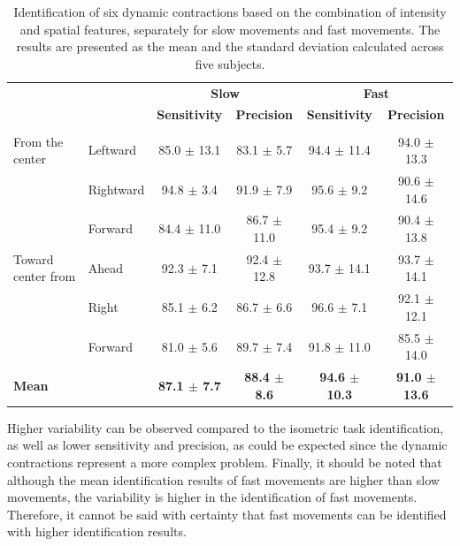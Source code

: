 \begin{table}[h!]
\centering
\caption{Identification of six dynamic contractions based on the combination of intensity and spatial features, separately for slow movements and fast movements. The results are presented as the mean and the standard deviation calculated across five subjects.}
\label{tb:4-4}
\begin{tabular}{llcccc}
                   &           & \multicolumn{2}{c}{\textbf{Slow}}           & \multicolumn{2}{c}{\textbf{Fast}}           \\
                   &           & \textbf{Sensitivity} & \textbf{Precision}   & \textbf{Sensitivity} & \textbf{Precision}   \\ \hline
                   &           & \multicolumn{1}{l}{} & \multicolumn{1}{l}{} & \multicolumn{1}{l}{} & \multicolumn{1}{l}{} \\
From the center    & Leftward  & 85.0 $\pm$ 13.1          & 83.1 $\pm$ 5.7           & 94.4 $\pm$ 11.4          & 94.0 $\pm$ 13.3          \\
                   & Rightward & 94.8 $\pm$ 3.4           & 91.9 $\pm$ 7.9           & 95.6 $\pm$ 9.2           & 90.6 $\pm$ 14.6          \\
                   & Forward   & 84.4 $\pm$ 11.0          & 86.7 $\pm$ 11.0          & 95.4 $\pm$ 9.2           & 90.4 $\pm$ 13.8          \\ \hline
Toward center from & Ahead     & 92.3 $\pm$ 7.1           & 92.4 $\pm$ 12.8          & 93.7 $\pm$ 14.1          & 93.7 $\pm$ 14.1          \\
                   & Right     & 85.1 $\pm$ 6.2           & 86.7 $\pm$ 6.6           & 96.6 $\pm$ 7.1           & 92.1 $\pm$ 12.1          \\
                   & Forward   & 81.0 $\pm$ 5.6           & 89.7 $\pm$ 7.4           & 91.8 $\pm$ 11.0          & 85.5 $\pm$ 14.0          \\ \hline
\textbf{Mean}      & \textbf{} & \textbf{87.1 $\pm$ 7.7}  & \textbf{88.4 $\pm$ 8.6}  & \textbf{94.6 $\pm$ 10.3} & \textbf{91.0 $\pm$ 13.6}
\end{tabular}
\end{table}

Higher variability can be observed compared to the isometric task identification, as well as lower sensitivity and precision, as could be expected since the dynamic contractions represent a more complex problem. Finally, it should be noted that although the mean identification results of fast movements are higher than slow movements, the variability is higher in the identification of fast movements. Therefore, it cannot be said with certainty that fast movements can be identified with higher identification results.


